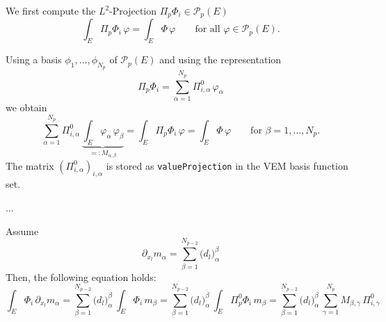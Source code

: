 \documentclass{article}
\begin{document}
We first compute the $L^2$-Projection $\Pi_p \Phi_i \in \mathcal{P}_p( E )$
\begin{equation*}
  \int_E \Pi_p \Phi_i\,\varphi = \int_E \Phi\,\varphi
  \qquad\text{for all $\varphi \in \mathcal{P}_p( E )$.}
\end{equation*}

Using a basis $\phi_1, \ldots, \phi_{N_p}$ of $\mathcal{P}_p( E )$ and using
the representation
\begin{equation*}
  \Pi_p \Phi_i = \sum_{\alpha=1}^{N_p} \Pi^0_{i,\alpha}\,\varphi_\alpha
\end{equation*}
we obtain
\begin{equation*}
  \sum_{\alpha=1}^{N_p} \Pi^0_{i, \alpha}\,\underbrace{\int_E \varphi_\alpha\,\varphi_\beta}_{=: M_{\alpha,\beta}}
  = \int_E \Pi_p \Phi_i\,\varphi
  = \int_E \Phi\,\varphi
  \qquad\text{for $\beta = 1, \ldots, N_p$.}
\end{equation*}
The matrix $(\Pi^0_{i, \alpha})_{i, \alpha}$ is stored as \texttt{valueProjection}
in the VEM basis function set.

...

Assume
\begin{equation*}
  \partial_{x_l} m_\alpha = \sum_{\beta=1}^{N_{p-2}} \bigl( d_l \bigr)_\alpha^\beta
\end{equation*}
Then, the following equation holds:
\begin{equation*}
  \int_E \Phi_i\,\partial_{x_l} m_\alpha
    = \sum_{\beta=1}^{N_{p-2}} \bigl( d_l \bigr)_\alpha^\beta\,\int_E \Phi_i\,m_\beta
    = \sum_{\beta=1}^{N_{p-2}} \bigl( d_l \bigr)_\alpha^\beta\,\int_E \Pi_p^0 \Phi_i\,m_\beta
    = \sum_{\beta=1}^{N_{p-2}} \bigl( d_l \bigr)_\alpha^\beta\,\sum_{\gamma=1}^{N_p} M_{\beta,\gamma}\,\Pi^0_{i, \gamma}
\end{equation*}
\end{document}
